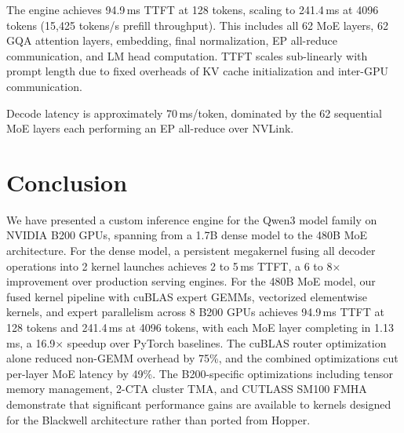 \documentclass[sigplan,screen]{acmart}
\begin{document}
The engine achieves 94.9\,ms TTFT at 128 tokens, scaling to 241.4\,ms at 4096 tokens (15{,}425 tokens/s prefill throughput). This includes all 62 MoE layers, 62 GQA attention layers, embedding, final normalization, EP all-reduce communication, and LM head computation. TTFT scales sub-linearly with prompt length due to fixed overheads of KV cache initialization and inter-GPU communication.

Decode latency is approximately 70\,ms/token, dominated by the 62 sequential MoE layers each performing an EP all-reduce over NVLink.

\section{Conclusion}

We have presented a custom inference engine for the Qwen3 model family on NVIDIA B200 GPUs, spanning from a 1.7B dense model to the 480B MoE architecture. For the dense model, a persistent megakernel fusing all decoder operations into 2 kernel launches achieves 2 to 5\,ms TTFT, a 6 to 8$\times$ improvement over production serving engines. For the 480B MoE model, our fused kernel pipeline with cuBLAS expert GEMMs, vectorized elementwise kernels, and expert parallelism across 8 B200 GPUs achieves 94.9\,ms TTFT at 128 tokens and 241.4\,ms at 4096 tokens, with each MoE layer completing in 1.13\,ms, a 16.9$\times$ speedup over PyTorch baselines. The cuBLAS router optimization alone reduced non-GEMM overhead by 75\%, and the combined optimizations cut per-layer MoE latency by 49\%. The B200-specific optimizations including tensor memory management, 2-CTA cluster TMA, and CUTLASS SM100 FMHA demonstrate that significant performance gains are available to kernels designed for the Blackwell architecture rather than ported from Hopper.



\end{document}
